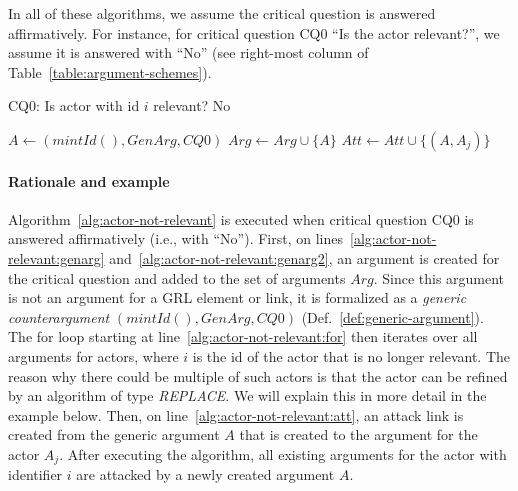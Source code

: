 In all of these algorithms, we assume the critical question is answered affirmatively. For instance, for critical question CQ0 ``Is the actor relevant?'', we assume it is answered with ``No'' (see right-most column of Table~\ref{table:argument-schemes}).

\begin{algorithm}[h]
  \caption{CQ0: Is actor with id $i$ relevant? No}\label{alg:actor-not-relevant}
  \begin{algorithmic}[1]
    \State $A \leftarrow (mintId(),GenArg,CQ0)$\label{alg:actor-not-relevant:genarg}
    \State $Arg\leftarrow Arg \cup \{A\}$\label{alg:actor-not-relevant:genarg2}
    \label{alg:actor-not-relevant:for}
      \State $Att \leftarrow Att \cup \{(A,A_j)\}$\label{alg:actor-not-relevant:att}
    \EndFor
    \EndProcedure
  \end{algorithmic}
\end{algorithm}

\paragraph{Rationale and example} Algorithm~\ref{alg:actor-not-relevant} is executed when critical question CQ0 is answered affirmatively (i.e., with ``No''). First, on lines~\ref{alg:actor-not-relevant:genarg} and~\ref{alg:actor-not-relevant:genarg2}, an argument is created for the critical question and added to the set of arguments $Arg$. Since this argument is not an argument for a GRL element or link, it is formalized as a \emph{generic counterargument} $(mintId(), GenArg, CQ0)$ (Def.~\ref{def:generic-argument}). The for loop starting at line~\ref{alg:actor-not-relevant:for} then iterates over all arguments for actors, where $i$ is the id of the actor that is no longer relevant. The reason why there could be multiple of such actors is that the actor can be refined by an algorithm of type \emph{REPLACE}. We will explain this in more detail in the example below. Then, on line~\ref{alg:actor-not-relevant:att}, an attack link is created from the generic argument $A$ that is created to the argument for the actor $A_j$. After executing the algorithm, all existing arguments for the actor with identifier $i$ are attacked by a newly created argument $A$.

